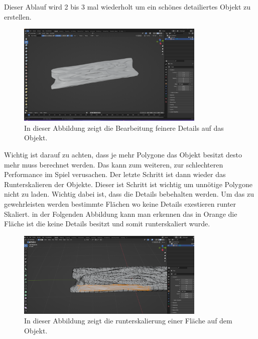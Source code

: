\noindent Dieser Ablauf wird 2 bis 3 mal wiederholt um ein schönes detailiertes Objekt zu erstellen.
\begin{figure}[H]
    \centering
    \includegraphics[width=0.8\textwidth]{chapters/13/images/HolzBrett2.png}
    \caption{In dieser Abbildung zeigt die Bearbeitung feinere Details auf das Objekt.}
    \label{UST-16}
\end{figure}
\noindent Wichtig ist darauf zu achten, dass je mehr Polygone das Objekt besitzt desto mehr muss berechnet werden. Das kann zum weiteren, zur schlechteren Performance im Spiel verusachen. Der letzte Schritt ist dann wieder das Runterskalieren der Objekte. Dieser ist Schritt ist wichtig um unnötige Polygone nicht zu laden. Wichtig dabei ist, dass die Details bebehalten werden. Um das zu gewehrleisten werden bestimmte Flächen wo keine Details exestieren runter Skaliert. in der Folgenden Abbildung kann man erkennen das in Orange die Fläche ist die keine Details besitzt und somit runterskaliert wurde.

\begin{figure}[H]
    \centering
    \includegraphics[width=0.8\textwidth]{chapters/13/images/HolzBrett3.png}
    \caption{In dieser Abbildung zeigt die runterskalierung einer Fläche auf dem Objekt.}
    \label{UST-17}
\end{figure}